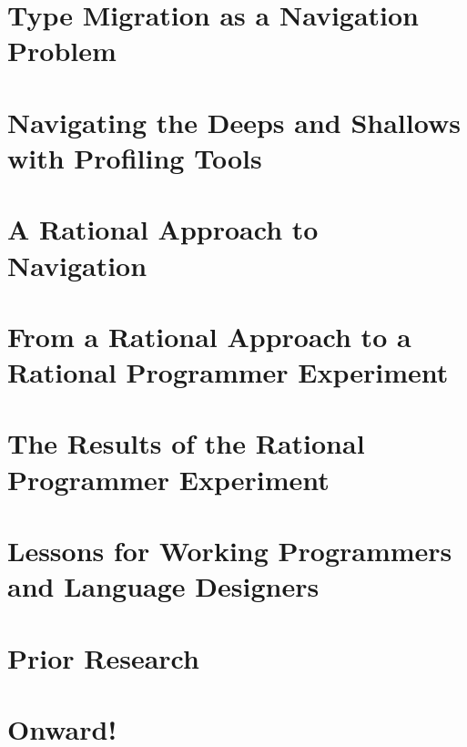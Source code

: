 \documentclass[acmsmall,review,screen]{acmart}
\begin{document}
\def\sec#1#2{\section{#2} \label{sec:#1} }

\sec{intro}       {Type Migration as a Navigation Problem}
\sec{seascape}    {Navigating the Deeps and Shallows with Profiling Tools}
\sec{ideas}       {A Rational Approach to Navigation}
\sec{experiment}  {From a Rational Approach to a Rational Programmer Experiment}
\sec{results}     {The Results of the Rational Programmer Experiment}
\sec{discussion}  {Lessons for Working Programmers and Language Designers}
\sec{related}     {Prior Research}
\sec{conclusion}  {Onward!}






\ifappendix{\appendix }{}
\end{document}

